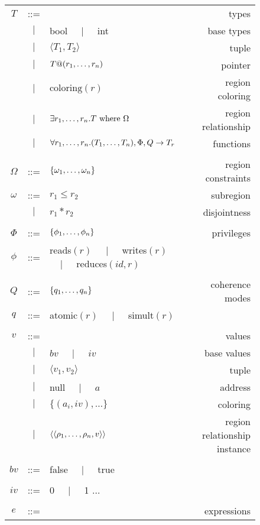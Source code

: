 \begin{figure*}
\centering
{\small
\begin{tabular}{cclr}

$T$ & ::= &  & types \\
  &$\mid$& bool $\;\;\;\mid\;\;\;$ int & base types \\
  &$\mid$& $\langle T_1, T_2 \rangle$ & tuple \\
  &$\mid$& $T@({r}_1,\ldots,{r}_n)$ & pointer \\
  &$\mid$& $\text{coloring}(r)$ & region coloring \\
  &$\mid$& $\exists {r}_1,\ldots,{r}_n. T\text{ where }\Omega$ & region relationship \\
  &$\mid$& $\forall {r}_1,\ldots,{r}_n. ({T}_1,\ldots,{T}_n), \Phi, Q \rightarrow T_r$ & functions \\
\\
$\Omega$ & ::= & $\{ {\omega}_1,\ldots,{\omega}_n \}$ & region constraints \\
$\omega$ & ::= & $r_1 \leq r_2$ & subregion \\
  &$\mid$& $r_1 * r_2$ & disjointness \\
\\
$\Phi$ & ::= & $\{ {\phi}_1,\ldots,{\phi}_n \}$ & privileges \\
$\phi$ & ::= & reads$(r)$ $\;\;\;\mid\;\;\;$ writes$(r)$ $\;\;\;\mid\;\;\;$ reduces$(id,r)$ & \\
\\
$Q$ & ::= & $\{ {q}_1,\ldots,{q}_n \}$ & coherence modes \\
$q$ & ::= & atomic$(r)$ $\;\;\;\mid\;\;\;$ simult$(r)$ & \\
\\
$v$ & ::= & & values \\
  &$\mid$& $bv$ $\;\;\;\mid\;\;\;$ $iv$ & base values \\
  &$\mid$& $\langle v_1, v_2 \rangle$ & tuple \\
  &$\mid$& null $\;\;\;\mid\;\;\;$ $a$ & address \\
  &$\mid$& $\{ (a_i, iv), \ldots \}$ & coloring \\
  &$\mid$& $\langle \langle {\rho}_1,\ldots,{\rho}_n, v\rangle \rangle$ & region relationship instance \\
\\
$bv$ & ::= & false $\;\;\;\mid\;\;\;$ true \\
\\
$iv$ & ::= & 0 $\;\;\;\mid\;\;\;$ 1 $\ldots$ \\
\\
$e$ & ::= & & expressions \\

\end{tabular}}
\end{figure*}
